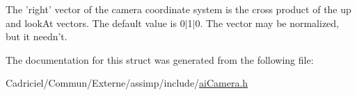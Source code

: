 The 'right' vector of the camera coordinate system is the cross product of the up and look\-At vectors. The default value is 0$\vert$1$\vert$0. The vector may be normalized, but it needn't. 

The documentation for this struct was generated from the following file\-:\begin{DoxyCompactItemize}
\item 
Cadriciel/\-Commun/\-Externe/assimp/include/\hyperlink{ai_camera_8h}{ai\-Camera.\-h}\end{DoxyCompactItemize}
